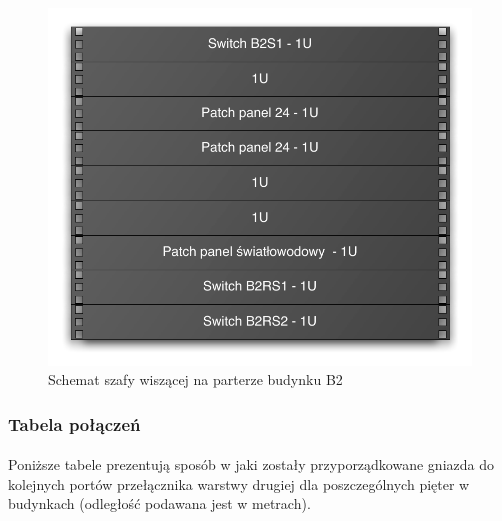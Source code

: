 \begin{figure}[H]
  \begin{center}
    \includegraphics[width=\textwidth]{img/s/szafa-b2.pdf}
    \caption{Schemat szafy wiszącej na parterze budynku B2}
  \end{center}
\end{figure}


\subsubsection{Tabela połączeń}
\paragraph{}
Poniższe tabele prezentują sposób w jaki zostały przyporządkowane gniazda do kolejnych portów przełącznika warstwy drugiej dla poszczególnych pięter w budynkach (odległość podawana jest w metrach).

